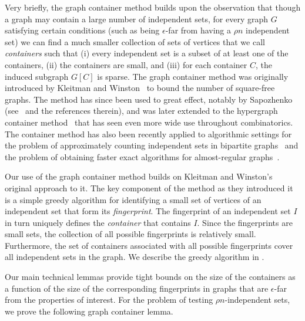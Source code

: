 \documentclass[11pt]{article}
\begin{document}
Very briefly, the graph container method builds upon the observation that though a graph may contain a large number of independent sets, for every graph $G$ satisfying certain conditions (such as being $\epsilon$-far from having a $\rho n$ independent set) we can find a much smaller collection of sets of vertices that we call \emph{containers} such that (i) every independent set is a subset of at least one of the containers, (ii) the containers are small, and (iii) for each container $C$, the induced subgraph $G[C]$ is sparse.
The graph container method was originally introduced by Kleitman and Winston~\cite{kleitmanWinston1982} to bound the number of square-free graphs. The method has since been used to great effect, notably by Sapozhenko (see~\cite{Sapozhenko05} and the references therein), and was later extended to the hypergraph container method~\cite{baloghIndependentSetsHypergraphs2015,saxtonThomasonHypergraphContainers2015} that has seen even more wide use throughout combinatorics. The container method has also been recently applied to algorithmic settings for the problem of approximately counting independent sets in bipartite graphs~\cite{JenssenPP23} and the problem of obtaining faster exact algorithms for almost-regular graphs~\cite{Zamir23}.

Our use of the graph container method builds on Kleitman and Winston's original approach to it. The key component of the method as they introduced it is a simple greedy algorithm for identifying a small set of vertices of an independent set that form its \emph{fingerprint}. The fingerprint of an independent set $I$ in turn uniquely defines the \emph{container} that contains $I$.
Since the fingerprints are small sets, the collection of all possible fingerprints is relatively small.
Furthermore, the set of containers associated with all possible fingerprints cover all independent sets in the graph.
We describe the greedy algorithm in .

Our main technical lemmas provide tight bounds on the size of the containers as a function of the size of the corresponding fingerprints in graphs that are $\epsilon$-far from the properties of interest.
For the problem of testing $\rho n$-independent sets, we prove the following graph container lemma.
\end{document}
